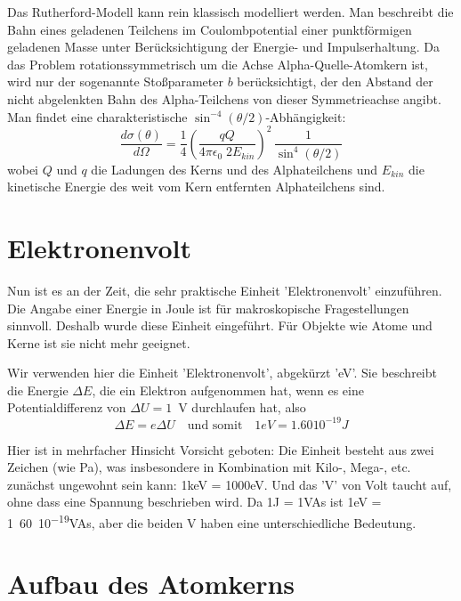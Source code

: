 Das Rutherford-Modell kann rein klassisch modelliert werden. Man beschreibt die Bahn eines geladenen Teilchens im Coulombpotential einer punktförmigen geladenen Masse unter Berücksichtigung der Energie- und Impulserhaltung. Da das Problem rotationssymmetrisch um die Achse Alpha-Quelle-Atomkern ist, wird nur der sogenannte Stoßparameter $b$ berücksichtigt, der den Abstand der nicht abgelenkten Bahn des Alpha-Teilchens von dieser Symmetrieachse angibt. Man findet  eine charakteristische $\sin^{-4} (\theta/2)$-Abhängigkeit:
\begin{equation}
    \frac{d \sigma(\theta)}{d\Omega} =
    \frac{1}{4} \left(
\frac{qQ}{4 \pi \epsilon_0 \; 2 E_{kin}}
    \right)^2 \, \frac{1}{\sin^4 (\theta/2)}
\end{equation}
wobei $Q$ und $q$ die Ladungen des Kerns und des Alphateilchens und $E_{kin}$ die kinetische Energie des weit vom Kern entfernten Alphateilchens sind.


\section{Elektronenvolt}

Nun ist es an der Zeit, die sehr praktische Einheit 'Elektronenvolt' einzuführen. Die Angabe einer Energie in Joule ist für makroskopische Fragestellungen sinnvoll. Deshalb wurde diese Einheit eingeführt. Für Objekte wie Atome und Kerne ist sie nicht mehr geeignet. 

Wir verwenden hier die Einheit 'Elektronenvolt', abgekürzt 'eV'. Sie beschreibt die Energie $\Delta E$, die ein Elektron aufgenommen hat, wenn es eine Potentialdifferenz von $\Delta U =1$~V durchlaufen hat, also 
\begin{equation}
    \Delta E = e \Delta U \quad \text{und somit} \quad \si{1}{eV} = \si{1.60 10^{-19}}{J}
\end{equation}

Hier ist in mehrfacher Hinsicht Vorsicht geboten: Die Einheit besteht aus zwei Zeichen (wie Pa), was insbesondere in Kombination mit Kilo-, Mega-, etc. zunächst ungewohnt sein kann: \si{1}{keV} = \si{1000}{eV}. Und das 'V' von Volt taucht auf, ohne dass eine Spannung beschrieben wird. Da \si{1}{J} = \si{1}{VAs} ist \si{1}{eV} = \si{1.60 10^{-19}}{VAs}, aber die beiden V haben eine unterschiedliche Bedeutung.


\section{Aufbau des Atomkerns}

